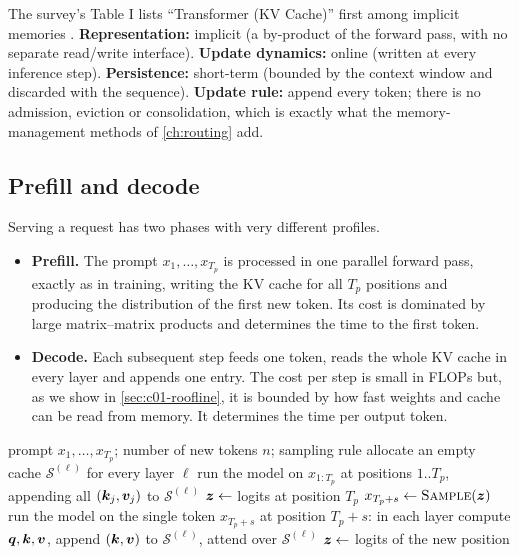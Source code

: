 \begin{taxonomy}
The survey's Table I lists ``Transformer (KV Cache)'' first among implicit memories
\citep{zhoubian2026memory}.
\textbf{Representation:} implicit (a by-product of the forward pass, with no separate
read/write interface). \textbf{Update dynamics:} online (written at every inference step).
\textbf{Persistence:} short-term (bounded by the context window and discarded with the
sequence). \textbf{Update rule:} append every token; there is no admission, eviction or
consolidation, which is exactly what the memory-management methods of \cref{ch:routing} add.
\end{taxonomy}

\subsection{Prefill and decode}\label{sec:c01-prefill-decode}

Serving a request has two phases with very different profiles.
\begin{itemize}
  \item \textbf{Prefill.} The prompt $x_1, \dots, x_{T_p}$ is processed in one parallel forward
  pass, exactly as in training, writing the KV cache for all $T_p$ positions and producing the
  distribution of the first new token. Its cost is dominated by large matrix--matrix
  products and determines the time to the first token.
  \item \textbf{Decode.} Each subsequent step feeds one token, reads the whole KV cache in
  every layer and appends one entry. The cost per step is small in FLOPs but, as we show in
  \cref{sec:c01-roofline}, it is bounded by how fast weights and cache can be read from
  memory. It determines the time per output token.
\end{itemize}

\begin{algorithm}[t]
\caption{Autoregressive generation with a KV cache.}\label{alg:c01-generate}
\begin{algorithmic}[1]
\Require prompt $x_1, \dots, x_{T_p}$; number of new tokens $n$; sampling rule
\State allocate an empty cache $\mathcal{S}^{(\ell)}$ for every layer $\ell$
\State run the model on $x_{1:T_p}$ at positions $1..T_p$, appending all $(\bm{k}_j, \bm{v}_j)$ to $\mathcal{S}^{(\ell)}$ 
\State $\bm{z} \gets$ logits at position $T_p$
  \State $x_{T_p+s} \gets \textsc{Sample}(\bm{z})$
  \State run the model on the single token $x_{T_p+s}$ at position $T_p+s$: 
  \Statex \hspace{\algorithmicindent}\hspace{\algorithmicindent} in each layer compute $\bm{q}, \bm{k}, \bm{v}$, append $(\bm{k}, \bm{v})$ to $\mathcal{S}^{(\ell)}$, attend over $\mathcal{S}^{(\ell)}$
  \State $\bm{z} \gets$ logits of the new position
\EndFor
\end{algorithmic}
\end{algorithm}

